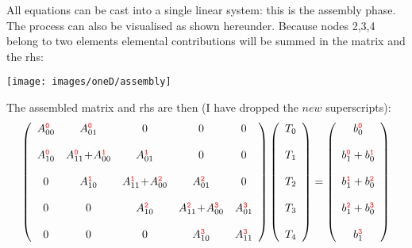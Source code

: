 All equations can be cast into a single linear system: this is the {\color{olive} assembly} phase.
The process can also be visualised as shown hereunder. Because nodes 2,3,4 belong to two elements 
elemental contributions will be summed in the matrix and the rhs:
\begin{center}
\texttt{[image: images/oneD/assembly]}
\end{center}
The assembled matrix and rhs are then (I have dropped the $new$ superscripts):
\[
\left(
\begin{array}{ccccc}
A_{00}^{{\color{red}\tt 0}} &  A_{01}^{{\color{red}\tt 0}} &0&0&0 \\ \\ 
A_{10}^{{\color{red}\tt 0}} &  A_{11}^{{\color{red} \tt 0}} \!+\! A_{00}^{{\color{red}\tt 1}}  & A_{01}^{{\color{red}\tt 1}}   &0&0 \\ \\
0& A_{10}^{{\color{red}\tt 1}} & A_{11}^{{\color{red} \tt 1}} \! +\! A_{00}^{{\color{red}\tt 2}}  & A_{01}^{{\color{red}\tt 2}}   & 0\\ \\
0&0& A_{10}^{{\color{red}\tt 2}}   & A_{11}^{{\color{red}\tt 2}} \! +\! A_{00}^{{\color{red}\tt 3}}   & A_{01}^{{\color{red}\tt 3}}  \\ \\
0&0&0& A_{10}^{{\color{red}\tt 3}}   & A_{11}^{{\color{red}\tt 3}} 
\end{array}
\right)
\left(
\begin{array}{c}
T_0 \\\\ T_1 \\\\ T_2 \\\\ T_3 \\\\ T_4
\end{array}
\right)
=
\left(
\begin{array}{c}
b_{0}^{{\color{red}\tt 0}} \\ \\
b_{1}^{{\color{red}\tt 0}} + b_{0}^{{\color{red}\tt 1}}\\ \\
b_{1}^{{\color{red}\tt 1}} + b_{0}^{{\color{red}\tt 2}}\\ \\
b_{1}^{{\color{red}\tt 2}} + b_{0}^{{\color{red}\tt 3}}\\ \\
b_{1}^{{\color{red}\tt 3}} 
\end{array}
\right)
\]

